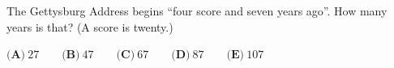The Gettysburg Address begins ``four score and seven years ago''. How many years is that? (A score is twenty.)

$\textbf{(A)}\ 27\qquad\textbf{(B)}\ 47\qquad\textbf{(C)}\ 67\qquad\textbf{(D)}\ 87\qquad\textbf{(E)}\ 107$
